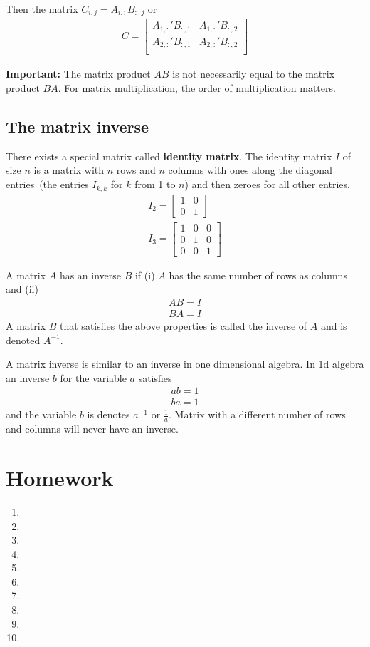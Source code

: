Then the matrix $C_{i,j} = A_{i,:} B_{:,j}$ or 
\begin{align}
    C = \begin{bmatrix}
           A_{1,:}' B_{:,1} & A_{1,:}' B_{:,2} \\ 
           A_{2,:}' B_{:,1} & A_{2,:}' B_{:,2} \\ 
        \end{bmatrix}
\end{align}

\textbf{Important:} The matrix product $AB$ is not necessarily equal to the matrix product $BA$. For matrix multiplication, the order of multiplication matters.

\subsection{The matrix inverse}

There exists a special matrix called \textbf{identity matrix}. 
The identity matrix $I$ of size $n$ is a matrix with $n$ rows and $n$ columns with ones along the diagonal entries~(the entries $I_{k,k}$ for $k$ from 1 to $n$) and then zeroes for all other entries.   
\begin{align}
    I_{2} = \begin{bmatrix}
        1 & 0 \\ 
        0 & 1 
    \end{bmatrix}\\
    I_{3} = \begin{bmatrix}
        1 & 0 & 0 \\ 
        0 & 1 & 0 \\ 
        0 & 0 & 1  
    \end{bmatrix}
\end{align}

A matrix $A$ has an inverse $B$ if (i) $A$ has the same number of rows as columns and (ii)
\begin{align}
    AB = I \\ 
    BA = I
\end{align}
A matrix $B$ that satisfies the above properties is called the inverse of $A$ and is denoted $A^{-1}$.

A matrix inverse is similar to an inverse in one dimensional algebra. In 1d algebra an inverse $b$ for the variable $a$ satisfies
\begin{align}
    ab = 1 \\ 
    ba = 1 
\end{align}
and the variable $b$ is denotes $a^{-1}$ or $\frac{1}{a}$. 
Matrix with a different number of rows and columns will never have an inverse.

\section{Homework}
\begin{enumerate}
    \item 
    \item 
    \item 
    \item 
    \item
    \item 
    \item 
    \item 
    \item 
    \item 
\end{enumerate}






